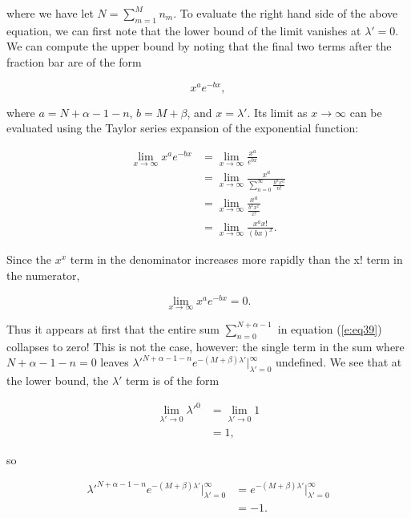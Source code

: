 \documentclass[12pt]{article}
\begin{document}
where we have let $N = \sum_{m = 1}^{M} n_m$. To evaluate the right hand side of the above equation, we can first note that the lower bound of the limit vanishes at $\lambda' = 0$. We can compute the upper bound by noting that the final two terms after the fraction bar are of the form

\begin{equation}
x^a e^{-bx},
\end{equation}

where $a = N + \alpha - 1 - n$, $b = M + \beta$, and $x = \lambda'$. Its limit as $x \to \infty$ can be evaluated using the Taylor series expansion of the exponential function:

\begin{align}
\lim_{x \to \infty} x^a e^{-bx} &= \lim_{x \to \infty} \frac{x^a}{e^{bx}} \\[5pt]
&= \lim_{x \to \infty} \frac{x^a}{\sum_{n = 0}^{\infty} \frac{b^n x^n}{n!}} \\[5pt]
&= \lim_{x \to \infty} \frac{x^a}{\frac{b^x x^x}{x!}} \\[5pt]
&= \lim_{x \to \infty} \frac{x^a x!}{(bx)^x}.
\end{align}

Since the $x^x$ term in the denominator increases more rapidly than the x! term in the numerator,

\begin{equation}
\lim_{x \to \infty} x^a e^{-bx} = 0.
\end{equation}

Thus it appears at first that the entire sum $\sum_{n = 0}^{N + \alpha - 1}$ in equation (\ref{e:eq39}) collapses to zero! This is not the case, however: the single term in the sum where $N + \alpha - 1 - n = 0$ leaves $\lambda'^{N + \alpha - 1 - n} e^{-(M + \beta)\lambda'}\Big|_{\lambda' = 0}^{\infty}$ undefined. We see that at the lower bound, the $\lambda'$ term is of the form

\begin{align}
\lim_{\lambda' \to 0} \lambda'^0 &= \lim_{\lambda' \to 0} 1 \\[5pt]
&= 1,
\end{align}

so

\begin{align}
\lambda'^{N + \alpha - 1 - n} e^{-(M + \beta)\lambda'}\Big|_{\lambda' = 0}^{\infty} &= e^{-(M + \beta)\lambda'}\Big|_{\lambda' = 0}^{\infty} \\[5pt]
&= -1.
\end{align}
\end{document}
